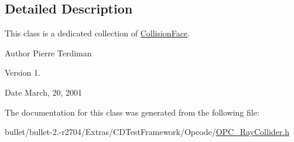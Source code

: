 \subsection{Detailed Description}
This class is a dedicated collection of \hyperlink{class_collision_face}{Collision\+Face}.

\begin{DoxyAuthor}{Author}
Pierre Terdiman 
\end{DoxyAuthor}
\begin{DoxyVersion}{Version}
1. 
\end{DoxyVersion}
\begin{DoxyDate}{Date}
March, 20, 2001 
\end{DoxyDate}


The documentation for this class was generated from the following file\+:\begin{DoxyCompactItemize}
\item 
bullet/bullet-\/2.-\/r2704/\+Extras/\+C\+D\+Test\+Framework/\+Opcode/\hyperlink{_o_p_c___ray_collider_8h}{O\+P\+C\+\_\+\+Ray\+Collider.\+h}\end{DoxyCompactItemize}
